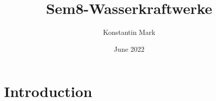 \documentclass{article}
\title{Sem8-Wasserkraftwerke}
\author{Konstantin Mark}
\date{June 2022}
\begin{document}
\maketitle

\section{Introduction}
\end{document}
